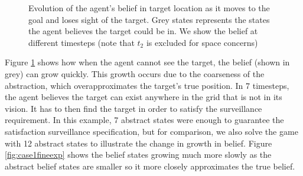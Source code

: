 \begin{figure}
\begin{minipage}{5.0cm}
\end{minipage}

	
	\caption{Evolution of the agent's belief in target location as it moves to the goal and loses sight of the target. Grey states represents the states the agent believes the target could be in. We show the belief at different timesteps (note that $t_2$ is excluded for space concerns)
		}
	\label{fig:case1exp}
	
\end{figure}

Figure \ref{fig:case1exp} shows how when the agent cannot see the target, the belief (shown in grey) can grow quickly. This growth occurs due to the coarseness of the abstraction, which overapproximates the target's true position. In 7 timesteps, the agent believes the target can exist anywhere in the grid that is not in its vision. It has to then find the target in order to satisfy the surveillance requirement. In this example, 7 abstract states were enough to guarantee the satisfaction surveillance specification, but for comparison, we also solve the game with 12 abstract states to illustrate the change in growth in belief. Figure \ref{fig:case1fineexp} shows the belief states growing much more slowly as the abstract belief states are smaller so it more closely approximates the true belief.

